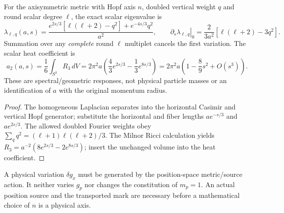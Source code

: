 \documentclass[11pt]{article}
\begin{document}
\begin{proposition}
\label{bh:berger:v117:p1a:spectral-heat}
For the axisymmetric metric with Hopf axis $n$, doubled vertical
weight $q$ and round scalar degree $\ell$, the exact scalar eigenvalue is
\[
 \lambda_{\ell,q}(a,s)=\frac{e^{2s/3}[\ell(\ell+2)-q^2]
                       +e^{-4s/3}q^2}{a^2},\qquad
 \left.\partial_s\lambda_{\ell,q}\right|_0
 =\frac{2}{3a^2}[\ell(\ell+2)-3q^2].
\]
Summation over any \emph{complete} round $\ell$ multiplet cancels the
first variation. The scalar heat coefficient is
\[
 a_2(a,s)=\frac16\int_{S^3}R_3\,dV
 =2\pi^2a\left(\frac43e^{2s/3}-\frac13e^{8s/3}\right)
 =2\pi^2a\left(1-\frac89s^2+O(s^3)\right).
\]
These are spectral/geometric responses, not physical particle masses
or an identification of $a$ with the original momentum radius.
\end{proposition}
\begin{proof}
The homogeneous Laplacian separates into the horizontal Casimir and
vertical Hopf generator; substitute the horizontal and fiber lengths
$a e^{-s/3}$ and $a e^{2s/3}$.  The allowed doubled Fourier weights
obey $\sum_q q^2=(\ell+1)\ell(\ell+2)/3$.
The Milnor Ricci calculation yields
$R_3=a^{-2}(8e^{2s/3}-2e^{8s/3})$;
insert the unchanged volume into the heat coefficient.
\end{proof}
\begin{remark}
\label{bh:berger:v117:p1a:firewall}
A physical variation $\delta g_x$ must be generated by the position-space
metric/source action.  It neither varies $g_p$ nor changes the
constitution of $m_p=1$.  An actual position source and the transported
mark are necessary before a mathematical choice of $n$ is a physical axis.
\end{remark}


\begingroup
\small
\printbibliography
\endgroup
\end{document}
